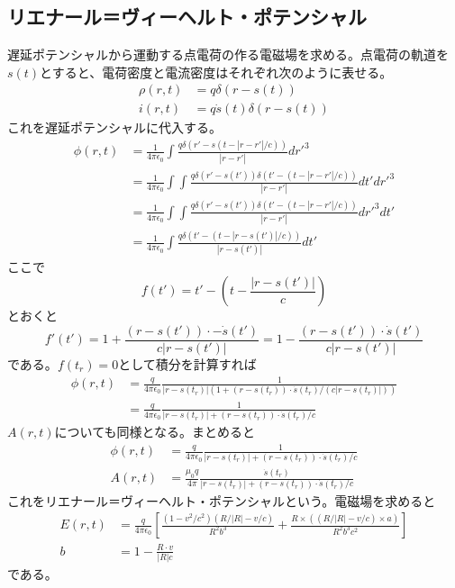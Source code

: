 \subsection{リエナール＝ヴィーヘルト・ポテンシャル}
    遅延ポテンシャルから運動する点電荷の作る電磁場を求める。点電荷の軌道を$s(t)$とすると、電荷密度と電流密度はそれぞれ次のように表せる。
    \begin{align*}
        \rho(r, t) &= q\delta(r - s(t))\\
        i(r, t) &= q\dot{s}(t)\delta(r - s(t))
    \end{align*}
    これを遅延ポテンシャルに代入する。
    \begin{align*}
        \phi(r, t)
        &= \frac{1}{4\pi\epsilon_0}\int \frac{q\delta(r' - s(t - |r - r'|/c))}{|r - r'|} dr'^3\\
        &= \frac{1}{4\pi\epsilon_0}\int\int \frac{q\delta(r' - s(t'))\delta(t' - (t - |r - r'|/c))}{|r - r'|} dt'dr'^3\\
        &= \frac{1}{4\pi\epsilon_0}\int\int \frac{q\delta(r' - s(t'))\delta(t' - (t - |r - r'|/c))}{|r - r'|} dr'^3dt'\\
        &= \frac{1}{4\pi\epsilon_0}\int \frac{q\delta(t' - (t - |r - s(t')|/c))}{|r - s(t')|} dt'
    \end{align*}
    ここで
        \[f(t') = t' - \left(t - \frac{|r - s(t')|}{c}\right)\]
    とおくと
        \[f'(t') = 1 + \frac{(r - s(t')) \cdot -\dot{s}(t')}{c|r - s(t')|} = 1 - \frac{(r - s(t')) \cdot \dot{s}(t')}{c|r - s(t')|}\]
    である。$f(t_r) = 0$として積分を計算すれば
    \begin{align*}
        \phi(r, t)
        &= \frac{q}{4\pi\epsilon_0}\frac{1}{|r - s(t_r)|(1 + (r - s(t_r)) \cdot \dot{s}(t_r) / (c|r - s(t_r)|))}\\
        &= \frac{q}{4\pi\epsilon_0}\frac{1}{|r - s(t_r)| + (r - s(t_r)) \cdot \dot{s}(t_r) / c}
    \end{align*}
    $A(r, t)$についても同様となる。まとめると
    \begin{align*}
        \phi(r, t) &= \frac{q}{4\pi\epsilon_0}\frac{1}{|r - s(t_r)| + (r - s(t_r)) \cdot \dot{s}(t_r) / c}\\
        A(r, t) &= \frac{\mu_0q}{4\pi}\frac{\dot{s}(t_r)}{|r - s(t_r)| + (r - s(t_r)) \cdot \dot{s}(t_r) / c}
    \end{align*}
    これをリエナール＝ヴィーヘルト・ポテンシャルという。電磁場を求めると
    \begin{align*}
        E(r, t) &= \frac{q}{4\pi\epsilon_0}\left[\frac{(1 - v^2/c^2)(R/|R| - v/c)}{R^2b^3} + \frac{R \times ((R/|R| - v/c) \times a)}{R^2b^3c^2}\right]\\
        b &= 1 - \frac{R \cdot v}{|R|c}
    \end{align*}
    である。

